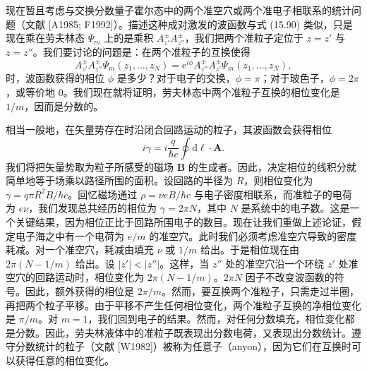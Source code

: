现在暂且考虑与交换分数量子霍尔态中的两个准空穴或两个准电子相联系的统计问题（文献 [A1985; F1992]）。描述这种成对激发的波函数与式 (15.90) 类似，只是现在乘在劳夫林态 $\Psi_{m}$ 上的是乘积 $A_{z'}^{\pm}A_{z''}^{\pm}$，我们把两个准粒子定位于 $z=z'$ 与 $z=z''$。我们要讨论的问题是：在两个准粒子的互换使得
\begin{equation*}
A_{z'}^{\pm}A_{z''}^{\pm}\Psi_{m}(z_{1},\ldots,z_{N})=\mathrm{e}^{i\phi}A_{z''}^{\pm}A_{z'}^{\pm}\Psi_{m}(z_{1},\ldots,z_{N}),\tag{15.93}
\end{equation*}
时，波函数获得的相位 $\phi$ 是多少？对于电子的交换，$\phi=\pi$；对于玻色子，$\phi=2\pi$，或等价地 $0$。我们现在就将证明，劳夫林态中两个准粒子互换的相位变化是 $1/m$，因而是分数的。

相当一般地，在矢量势存在时沿闭合回路运动的粒子，其波函数会获得相位
\begin{equation*}
i\gamma=i\frac{q}{\hbar c}\oint\mathrm{d}\ell\cdot\mathbf{A}.\tag{15.94}
\end{equation*}
我们将把矢量势取为粒子所感受的磁场 $\mathbf{B}$ 的生成者。因此，决定相位的线积分就简单地等于场乘以路径所围的面积。设回路的半径为 $R$，则相位变化为 $\gamma=q\pi R^{2}B/\hbar c$。回忆磁场通过 $\rho=\nu eB/\hbar c$ 与电子密度相联系，而准粒子的电荷为 $e\nu$，我们发现总共经历的相位为 $\gamma=2\pi N$，其中 $N$ 是系统中的电子数。这是一个关键结果，因为相位正比于回路所围电子的数目。现在让我们重做上述论证，假定电子海之中有一个电荷为 $e/m$ 的准空穴。此时我们必须考虑准空穴导致的密度耗减。对一个准空穴，耗减由填充 $\nu$ 或 $1/m$ 给出。于是相位现在由 $2\pi(N-1/m)$ 给出。设 $|z'|<|z''|$。这样，当 $z''$ 处的准空穴沿一个环绕 $z'$ 处准空穴的回路运动时，相位变化为 $2\pi(N-1/m)$。$2\pi N$ 因子不改变波函数的符号。因此，额外获得的相位是 $2\pi/m$。然而，要互换两个准粒子，只需走过半圈，再把两个粒子平移。由于平移不产生任何相位变化，两个准粒子互换的净相位变化是 $\pi/m$。对 $m=1$，我们回到电子的结果。然而，对任何分数填充，相位变化都是分数。因此，劳夫林液体中的准粒子既表现出分数电荷，又表现出分数统计。遵守分数统计的粒子（文献 [W1982]）被称为任意子（anyon），因为它们在互换时可以获得任意的相位变化。

